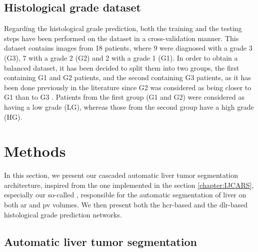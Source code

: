 \subsection{Histological grade dataset}

Regarding the histological grade prediction, both the training and the testing steps have been performed on the \textbf{} dataset in a cross-validation manner.
This dataset contains images from 18 patients, where 9 were diagnosed 
with a grade 3 (G3), 7 with a grade 2 (G2) and 2 with a grade 1 (G1). In order
to obtain a balanced dataset, it has been decided to split them
into two groups, the first containing G1 and G2 patients, and the second containing G3 patients, as it has been done previously in the literature since G2
was considered as being closer to G1 than to G3 \cite{Han2013,Zucman-Rossi2015}. Patients from the first group (G1 and G2) were considered as
having a low grade (LG), whereas those from the second group have a high
grade (HG).


\section{Methods}

In this section, we present our cascaded automatic liver tumor segmentation architecture, inspired from the one implemented in the section \ref{chapter:IJCARS}, especially our so-called , responsible for the automatic segmentation of liver on both \ac{ar} and \ac{pv} volumes. We then present both the \ac{hcr}-based and the \ac{dlr}-based histological grade prediction networks.


\subsection{Automatic liver tumor segmentation} \label{subsect_auto_liver_tumor_seg}

